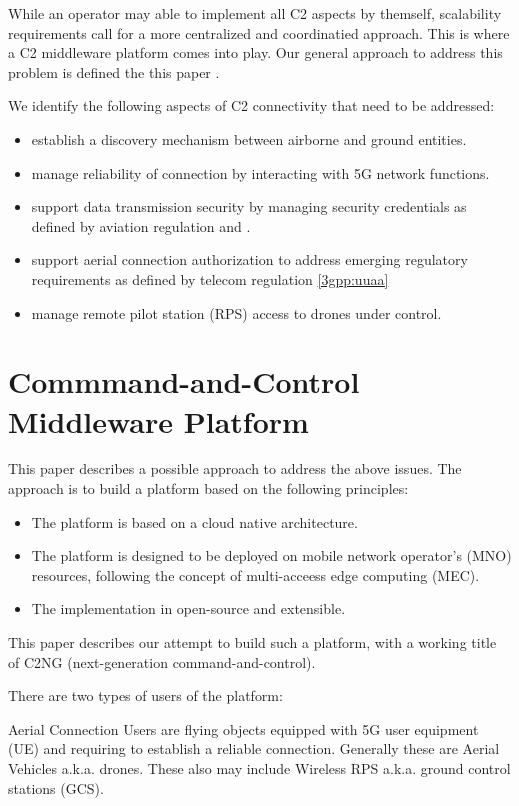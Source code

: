 \documentclass[a4paper,conference]{IEEEtran}
\begin{document}
While an operator may able to implement all C2 aspects by themself, scalability requirements call for a more centralized and coordinatied approach. This is where a C2 middleware platform comes into play. Our general approach to address this problem is defined the this paper \cite{uai}.

We identify the following aspects of C2 connectivity that need to be addressed:

\begin{itemize}
\item establish a discovery mechanism between airborne and ground entities.
\item manage reliability of connection by interacting with 5G network functions.
\item support data transmission security by managing security credentials as defined by aviation regulation \cite{icao:annex10VI} and \cite{rtca:do377a}.
\item support aerial connection authorization to address emerging regulatory requirements as defined by telecom regulation \ref{3gpp:uuaa}
\item manage remote pilot station (RPS) access to drones under control.
\end{itemize}

\section{Commmand-and-Control Middleware Platform}

This paper describes a possible approach to address the above issues. The approach is to build a platform based on the following principles:

\begin{itemize}
\item The platform is based on a cloud native architecture.
\item The platform is designed to be deployed on mobile network operator's (MNO) resources, following the concept of multi-acceess edge computing (MEC).
\item The implementation in open-source and extensible.
\end{itemize}

This paper describes our attempt to build such a platform, with a working title of C2NG (next-generation command-and-control).

There are two types of users of the platform:

Aerial Connection Users are flying objects equipped with 5G user equipment (UE) and requiring to establish a reliable connection. Generally these are Aerial Vehicles a.k.a. drones. These also may include Wireless RPS a.k.a. ground control stations (GCS).
\end{document}
